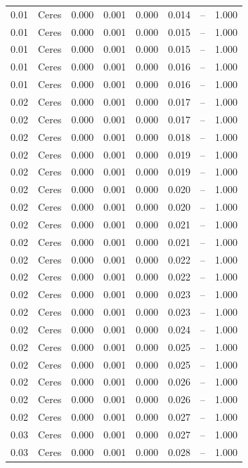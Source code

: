 \begin{table}[H]
\begin{tabular}{l c l l l}
0.01 & Ceres & 0.000 & 0.001 & 0.000 & 0.014 & -- & 1.000 \\
0.01 & Ceres & 0.000 & 0.001 & 0.000 & 0.015 & -- & 1.000 \\
0.01 & Ceres & 0.000 & 0.001 & 0.000 & 0.015 & -- & 1.000 \\
0.01 & Ceres & 0.000 & 0.001 & 0.000 & 0.016 & -- & 1.000 \\
0.01 & Ceres & 0.000 & 0.001 & 0.000 & 0.016 & -- & 1.000 \\
0.02 & Ceres & 0.000 & 0.001 & 0.000 & 0.017 & -- & 1.000 \\
0.02 & Ceres & 0.000 & 0.001 & 0.000 & 0.017 & -- & 1.000 \\
0.02 & Ceres & 0.000 & 0.001 & 0.000 & 0.018 & -- & 1.000 \\
0.02 & Ceres & 0.000 & 0.001 & 0.000 & 0.019 & -- & 1.000 \\
0.02 & Ceres & 0.000 & 0.001 & 0.000 & 0.019 & -- & 1.000 \\
0.02 & Ceres & 0.000 & 0.001 & 0.000 & 0.020 & -- & 1.000 \\
0.02 & Ceres & 0.000 & 0.001 & 0.000 & 0.020 & -- & 1.000 \\
0.02 & Ceres & 0.000 & 0.001 & 0.000 & 0.021 & -- & 1.000 \\
0.02 & Ceres & 0.000 & 0.001 & 0.000 & 0.021 & -- & 1.000 \\
0.02 & Ceres & 0.000 & 0.001 & 0.000 & 0.022 & -- & 1.000 \\
0.02 & Ceres & 0.000 & 0.001 & 0.000 & 0.022 & -- & 1.000 \\
0.02 & Ceres & 0.000 & 0.001 & 0.000 & 0.023 & -- & 1.000 \\
0.02 & Ceres & 0.000 & 0.001 & 0.000 & 0.023 & -- & 1.000 \\
0.02 & Ceres & 0.000 & 0.001 & 0.000 & 0.024 & -- & 1.000 \\
0.02 & Ceres & 0.000 & 0.001 & 0.000 & 0.025 & -- & 1.000 \\
0.02 & Ceres & 0.000 & 0.001 & 0.000 & 0.025 & -- & 1.000 \\
0.02 & Ceres & 0.000 & 0.001 & 0.000 & 0.026 & -- & 1.000 \\
0.02 & Ceres & 0.000 & 0.001 & 0.000 & 0.026 & -- & 1.000 \\
0.02 & Ceres & 0.000 & 0.001 & 0.000 & 0.027 & -- & 1.000 \\
0.03 & Ceres & 0.000 & 0.001 & 0.000 & 0.027 & -- & 1.000 \\
0.03 & Ceres & 0.000 & 0.001 & 0.000 & 0.028 & -- & 1.000 \\

\end{tabular}
\end{table}
